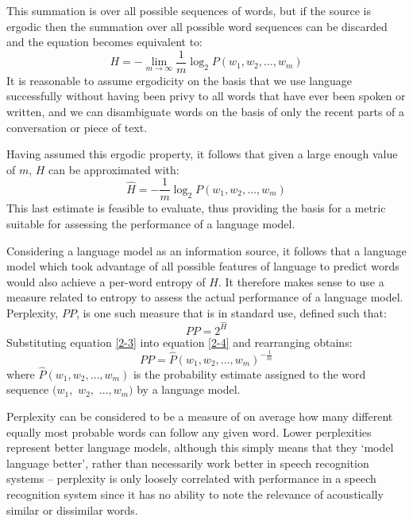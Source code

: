 This summation is over all possible sequences of words, but if the
source is ergodic then the summation over all possible word sequences
can be discarded and the equation becomes equivalent to:
\begin{equation}
H = - \lim_{m \to \infty} \frac{1}{m} \log_2 P(w_1, w_2, \ldots, w_m)
\end{equation}
It is reasonable to assume ergodicity on the basis that we use
language successfully without having been privy to all words that have
ever been spoken or written, and we can disambiguate words on the
basis of only the recent parts of a conversation or piece of text.

Having assumed this ergodic property, it follows that given a large
enough value of $m$, $H$ can be approximated with:
\begin{equation}\label{2-3}
\hat{H} = - \frac{1}{m} \log_2 P(w_1, w_2, \ldots, w_m)
\end{equation}
This last estimate is feasible to evaluate, thus providing the basis
for a metric suitable for assessing the performance of a language model.

Considering a language model as an information source, it follows that
a language model which took advantage of all possible features of
language to predict words would also achieve a per-word entropy of
$H$. It therefore makes sense to use a measure related to entropy to
assess the actual performance of a language model. Perplexity, $PP$,
is one such measure that is in standard use, defined such that:
\begin{equation}\label{2-4}
PP = 2^{\hat{H}}
\end{equation}
Substituting equation \ref{2-3} into equation \ref{2-4} and
rearranging obtains:
\begin{equation}
PP = \hat{P}(w_1, w_2, \ldots, w_m)^{-\frac{1}{m}}\label{pp_sum_eqn}
\end{equation}
where $\hat{P}(w_1, w_2, \ldots, w_m)$ is the probability estimate assigned to
the word sequence $(w_1,$ $w_2,$ $\ldots, w_m)$ by a language model.

Perplexity can be considered to be a measure of on average how many
different equally most probable words can follow any given word.
Lower perplexities represent better language models, although this
simply means that they `model language better', rather than
necessarily work better in speech recognition systems -- perplexity is
only loosely correlated with performance in a speech recognition
system since it has no ability to note the relevance of acoustically
similar or dissimilar words.


